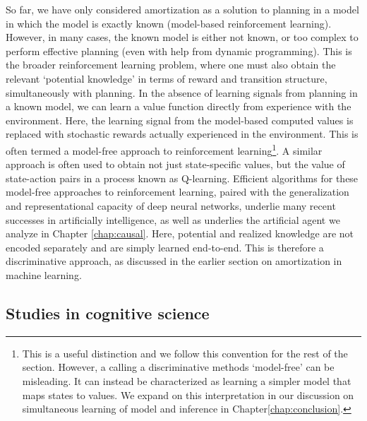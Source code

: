 So far, we have only considered amortization as a solution to planning in a model in which the model is exactly known (model-based reinforcement learning). However, in many cases, the known model is either not known, or too complex to perform effective planning (even with help from dynamic programming). This is the broader reinforcement learning problem, where one must also obtain the relevant `potential knowledge' in terms of reward and transition structure, simultaneously with planning. In the absence of learning signals from planning in a known model, we can learn a value function directly from experience with the environment. Here, the learning signal from the model-based computed values is replaced with stochastic rewards actually experienced in the environment. This is often termed a model-free approach to reinforcement learning\footnote{This is a useful distinction and we follow this convention for the rest of the section. However, a calling a discriminative methods `model-free' can be misleading. It can instead be characterized as learning a simpler model that maps states to values. We expand on this interpretation in our discussion on simultaneous learning of model and inference in Chapter\ref{chap:conclusion}.}. A similar approach is often used to obtain not just state-specific values, but the value of state-action pairs in a process known as Q-learning\citep{watkins1992q}. Efficient algorithms for these model-free approaches to reinforcement learning, paired with the generalization and representational capacity of deep neural networks, underlie many recent successes in artificially intelligence\citep{mnih2013playing}, as well as underlies the artificial agent we analyze in Chapter \ref{chap:causal}. Here, potential and realized knowledge are not encoded separately and are simply learned end-to-end. This is therefore a discriminative approach, as discussed in the earlier section on amortization in machine learning.

\subsection*{Studies in cognitive science}

